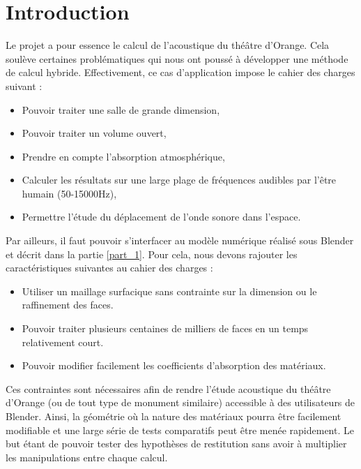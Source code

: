 \section*{Introduction} \label{sect_methodecouplee}
Le projet a pour essence le calcul de l'acoustique du théâtre d'Orange. Cela soulève certaines problématiques qui nous ont poussé à développer une méthode de calcul hybride. Effectivement, ce cas d'application impose le cahier des charges suivant :
\begin{itemize}
	\item Pouvoir traiter une salle de grande dimension,
	\item Pouvoir traiter un volume ouvert,
	\item Prendre en compte l'absorption atmosphérique,
	\item Calculer les résultats sur une large plage de fréquences audibles par l'être humain (50-15000Hz),
	\item Permettre l'étude du déplacement de l'onde sonore dans l'espace.
\end{itemize}
Par ailleurs, il faut pouvoir s'interfacer au modèle numérique réalisé sous Blender et décrit dans la partie \ref{part_1}. Pour cela, nous devons rajouter les caractéristiques suivantes au cahier des charges :

\begin{itemize}
	\item Utiliser un maillage surfacique sans contrainte sur la dimension ou le raffinement des faces.
	\item Pouvoir traiter plusieurs centaines de milliers de faces en un temps relativement court.
	\item Pouvoir modifier facilement les coefficients d'absorption des matériaux.
\end{itemize}

Ces contraintes sont nécessaires afin de rendre l'étude acoustique du théâtre d'Orange (ou de tout type de monument similaire) accessible à des utilisateurs de Blender. Ainsi, la géométrie où la nature des matériaux pourra être facilement modifiable et une large série de tests comparatifs peut être menée rapidement. Le but étant de pouvoir tester des hypothèses de restitution sans avoir à multiplier les manipulations entre chaque calcul.


